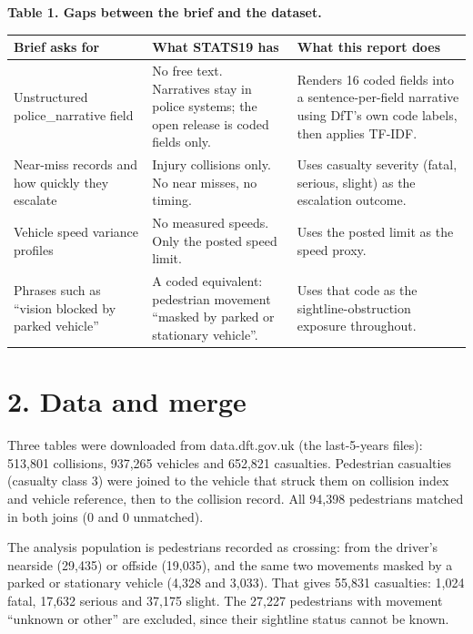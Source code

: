 \documentclass[10pt,a4paper]{article}
\begin{document}
\begin{center}\begin{minipage}{\textwidth}{\small\bfseries Table 1. Gaps between the brief and the dataset.}\\[3pt]\small\setlength{\tabcolsep}{3pt}\begin{tabular}{@{}>{\raggedright\arraybackslash}p{}>{\raggedright\arraybackslash}p{}>{\raggedright\arraybackslash}p{}@{}}\toprule \textbf{Brief asks for} & \textbf{What STATS19 has} & \textbf{What this report does} \\ \midrule 
Unstructured police\_narrative field & No free text. Narratives stay in police systems; the open release is coded fields only. & Renders 16 coded fields into a sentence-per-field narrative using DfT's own code labels, then applies TF-IDF. \\
Near-miss records and how quickly they escalate & Injury collisions only. No near misses, no timing. & Uses casualty severity (fatal, serious, slight) as the escalation outcome. \\
Vehicle speed variance profiles & No measured speeds. Only the posted speed limit. & Uses the posted limit as the speed proxy. \\
Phrases such as ``vision blocked by parked vehicle'' & A coded equivalent: pedestrian movement ``masked by parked or stationary vehicle''. & Uses that code as the sightline-obstruction exposure throughout. \\ \bottomrule\end{tabular}\end{minipage}\end{center}

\section*{2. Data and merge}

Three tables were downloaded from data.dft.gov.uk (the last-5-years files): 513,801 collisions, 937,265 vehicles and 652,821 casualties. Pedestrian casualties (casualty class 3) were joined to the vehicle that struck them on collision index and vehicle reference, then to the collision record. All 94,398 pedestrians matched in both joins (0 and 0 unmatched).\par

The analysis population is pedestrians recorded as crossing: from the driver's nearside (29,435) or offside (19,035), and the same two movements masked by a parked or stationary vehicle (4,328 and 3,033). That gives 55,831 casualties: 1,024 fatal, 17,632 serious and 37,175 slight. The 27,227 pedestrians with movement ``unknown or other'' are excluded, since their sightline status cannot be known.\par
\end{document}
